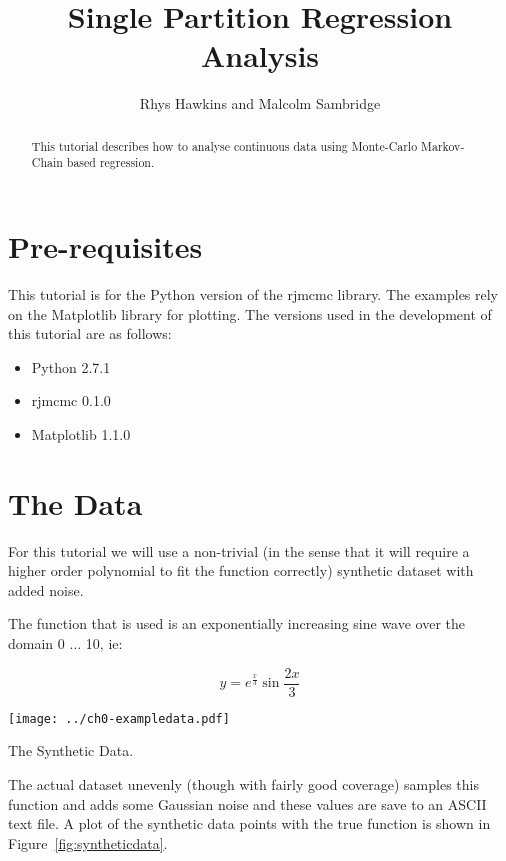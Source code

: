 \documentclass{tufte-handout}
\title{Single Partition Regression Analysis}
\author{Rhys Hawkins and Malcolm Sambridge}
\begin{document}
\maketitle

\begin{abstract}

This tutorial describes how to analyse continuous data using Monte-Carlo
Markov-Chain based regression.

\end{abstract}

\section{Pre-requisites}

This tutorial is for the Python version of the rjmcmc library. The examples
rely on the Matplotlib library for plotting. The versions used in the 
development of this tutorial are as follows:

\begin{itemize}
\item Python 2.7.1
\item rjmcmc 0.1.0
\item Matplotlib 1.1.0
\end{itemize}

\section{The Data}

For this tutorial we will use a non-trivial (in the sense that it will
require a higher order polynomial to fit the function correctly)
synthetic dataset with added noise.

The function that is used is an exponentially increasing sine wave over 
the domain 0 $\ldots$ 10, ie:

\begin{equation}
y = e^\frac{x}{3} \sin{ \frac{2x}{3}}
\end{equation}

\begin{marginfigure}
\texttt{[image: ../ch0-exampledata.pdf]}
\caption{The Synthetic Data.}
\label{fig:syntheticdata}
\end{marginfigure}

The actual dataset unevenly (though with fairly good coverage) samples
this function and adds some Gaussian noise and these values are save
to an ASCII text file. A plot of the synthetic data points with the 
true function is shown in Figure~\ref{fig:syntheticdata}.
\end{document}

